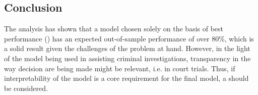 \begin{comment}
\end{comment}

\subsection{Conclusion}
The analysis has shown that a model chosen solely on the basis of best performance () has an expected out-of-sample performance of over 80\%, which is a solid result given the challenges of the problem at hand. However, in the light of the model being used in assisting criminal investigations, transparency in the way decision are being made might be relevant, i.e. in court trials. Thus, if interpretability of the model is a core requirement for the final model, a   should be considered.